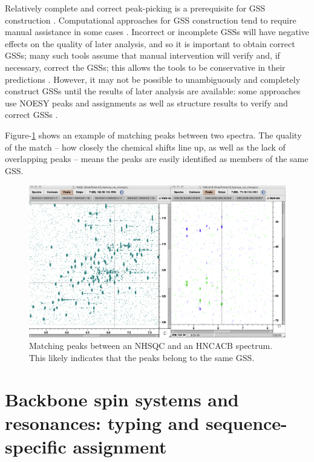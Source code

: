 Relatively complete and correct peak-picking is a prerequisite for GSS 
construction \cite{mars}.  Computational approaches 
for GSS construction tend to require manual assistance in some cases 
\cite{autoassign1997, mars}.  Incorrect or 
incomplete GSSs will have negative effects on the quality of later 
analysis, and so it is important to obtain correct GSSs; many such 
tools assume that manual intervention will verify and, if necessary, 
correct the GSSs; this allows the tools to be conservative in their 
predictions \cite{autoassign1997}.  However, it may not be 
possible to unambiguously and completely construct GSSs until the results 
of later analysis are available: some approaches use NOESY peaks and 
assignments as well as structure results to verify and correct GSSs 
\cite{autoassign1997}.

Figure-\ref{nhsqc_hncacb} shows an example of matching peaks between two
spectra.  The quality of the match -- how closely the chemical shifts line up,
as well as the lack of overlapping peaks -- means the peaks are easily
identified as members of the same GSS.
\begin{figure}
  \includegraphics[scale=0.3]{figures/nhsqc_hncacb}
  \caption[Matching peaks between an NHSQC and an HNCACB spectrum]
          {Matching peaks between an NHSQC and an HNCACB spectrum.
           This likely indicates that the peaks belong to the same GSS.}
  \label{nhsqc_hncacb}
\end{figure}



\section{Backbone spin systems and resonances: typing and sequence-specific assignment}

